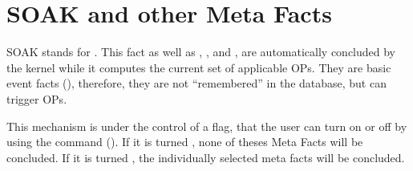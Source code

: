 \section{SOAK and other Meta Facts}

SOAK stands for . This fact as well as
, ,
 and , are
automatically concluded by the kernel while it computes the current set
of applicable OPs. They are basic event facts (),
therefore, they are not ``remembered'' in the database, but can trigger
OPs.

This mechanism is under the control of a flag, that the user can turn on or off
by using the command  (). If it is turned , none of theses Meta Facts will be
concluded. If it is turned , the individually selected meta facts will
be concluded.

